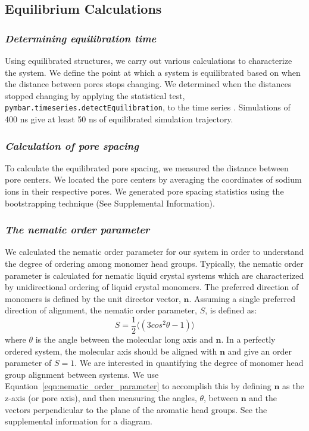 \documentclass[journal=jpcbfk,manusciprt=article]{achemso}
\begin{document}
  \subsection{Equilibrium Calculations}

  \subsubsection{\textit{Determining equilibration time}}

  Using equilibrated structures, we carry out various calculations to
  characterize the system. We define the point at which a system is equilibrated
  based on when the distance between pores stops changing.  We determined when
  the distances stopped changing by applying the statistical test,
  \texttt{pymbar.timeseries.detectEquilibration}, to the time series
  \cite{chodera_simple_2016,shirts_statistically_2008}. Simulations of 400 ns
  give at least 50 ns of equilibrated simulation trajectory.

  \subsubsection{\textit{Calculation of pore spacing}}

  To calculate the equilibrated pore spacing, we measured the distance between
  pore centers. We located the pore centers by averaging the coordinates of sodium
  ions in their respective pores. We generated pore spacing statistics 
  using the bootstrapping technique (See Supplemental Information).

  \subsubsection{\textit{The nematic order parameter}}

  We calculated the nematic order parameter for our system in order to
  understand the degree of ordering among monomer head groups. Typically, the
  nematic order parameter is calculated for nematic liquid crystal systems which
  are characterized by unidirectional ordering of liquid crystal monomers. The
  preferred direction of monomers is defined by the unit director vector,
  $\mathbf{n}$. Assuming a single preferred direction of alignment, the nematic
  order parameter, $S$, is defined as:
  \begin{equation}
	 S = \frac{1}{2} \langle(3cos^2\theta -1)\rangle
	\label{eqn:nematic_order_parameter}
  \end{equation}
  where $\theta$ is the angle between the molecular long axis and $\mathbf{n}$.
  In a perfectly ordered system, the molecular axis should be aligned with
  $\mathbf{n}$ and give an order parameter of $S=1$. We are interested in
  quantifying the degree of monomer head group alignment between systems. We use
  Equation~\ref{eqn:nematic_order_parameter} to accomplish this by defining
  $\mathbf{n}$ as the z-axis (or pore axis), and then measuring the angles,
  $\theta$, between $\mathbf{n}$ and the vectors perpendicular to the plane of
  the aromatic head groups. See the supplemental information for a diagram.  
  
\end{document}

